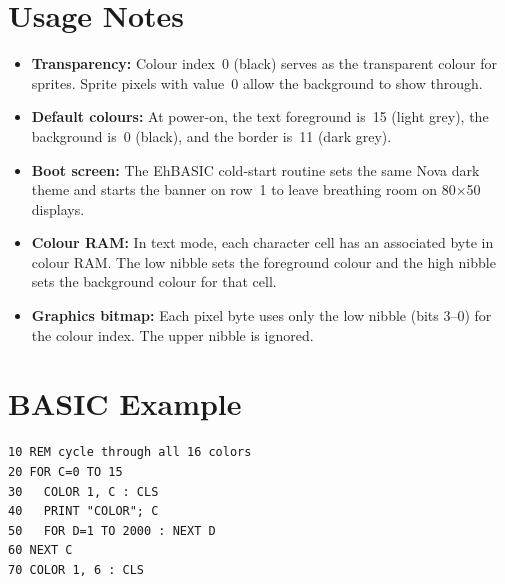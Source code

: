 \section{Usage Notes}
\label{sec:color-usage}

\begin{itemize}
  \item \textbf{Transparency:} Colour index~0 (black) serves as the transparent
        colour for sprites.  Sprite pixels with value~0 allow the background to
        show through.
  \item \textbf{Default colours:} At power-on, the text foreground is~15
        (light grey), the background is~0 (black), and the border is~11
        (dark grey).
  \item \textbf{Boot screen:} The EhBASIC cold-start routine sets the
        same Nova dark theme and starts the banner on row~1 to leave breathing
        room on 80$\times$50 displays.
  \item \textbf{Colour RAM:} In text mode, each character cell has an associated
        byte in colour RAM.  The low nibble sets the foreground colour and the
        high nibble sets the background colour for that cell.
  \item \textbf{Graphics bitmap:} Each pixel byte uses only the low nibble
        (bits 3--0) for the colour index.  The upper nibble is ignored.
\end{itemize}


\section{BASIC Example}
\label{sec:color-example}

\begin{lstlisting}
10 REM cycle through all 16 colors
20 FOR C=0 TO 15
30   COLOR 1, C : CLS
40   PRINT "COLOR"; C
50   FOR D=1 TO 2000 : NEXT D
60 NEXT C
70 COLOR 1, 6 : CLS
\end{lstlisting}
